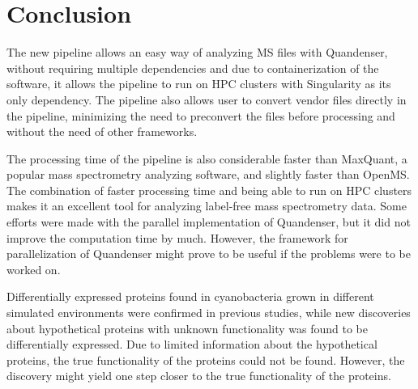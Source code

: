 \section{Conclusion}

The new pipeline allows an easy way of analyzing MS files with Quandenser, without requiring multiple dependencies and due to containerization of the software, it allows the pipeline to run on HPC clusters with Singularity as its only dependency. The pipeline also allows user to convert vendor files directly in the pipeline, minimizing the need to preconvert the files before processing and without the need of other frameworks.

The processing time of the pipeline is also considerable faster than MaxQuant, a popular mass spectrometry analyzing software, and slightly faster than OpenMS. The combination of faster processing time and being able to run on HPC clusters makes it an excellent tool for analyzing label-free mass spectrometry data. Some efforts were made with the parallel implementation of Quandenser, but it did not improve the computation time by much. However, the framework for parallelization of Quandenser might prove to be useful if the problems were to be worked on.

Differentially expressed proteins found in cyanobacteria grown in different simulated environments were confirmed in previous studies, while new discoveries about hypothetical proteins with unknown functionality was found to be differentially expressed. Due to limited information about the hypothetical proteins, the true functionality of the proteins could not be found. However, the discovery might yield one step closer to the true functionality of the proteins.
